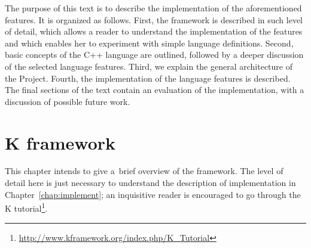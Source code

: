 \documentclass[nolot,nolof,nocover,printed]{fithesis3}
\newcommand{\Project}{Project\xspace}
\begin{document}
 

The purpose of this text is to describe the implementation of the aforementioned features. It is organized as follows. First, the \K framework is described in such level of detail, which allows a reader to understand the implementation of the features and which enables her to experiment with simple language definitions. Second, basic concepts of the C++ language are outlined, followed by a deeper discussion of the selected language features. Third, we explain the general architecture of the \Project. Fourth, the implementation of the language features is described. The final sections of the text contain an evaluation of the implementation, with a discussion of possible future work.





\chapter{K framework} \label{chap:k}

This chapter intends to give a~brief overview of the \K framework.
The level of detail here is just necessary to understand the description of implementation in Chapter~\ref{chap:implement}; an inquisitive reader is encouraged to go through the K tutorial\footnote{\url{http://www.kframework.org/index.php/K_Tutorial}}.

%


\end{document}
